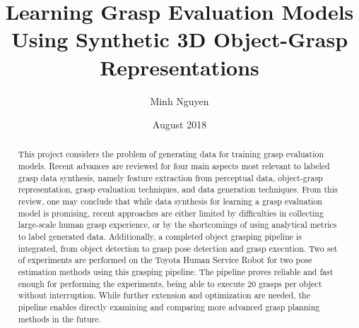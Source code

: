 \documentclass[rnd]{mas_report}
\author{Minh Nguyen}
\title{Learning Grasp Evaluation Models Using Synthetic 3D Object-Grasp Representations}
\date{August 2018}
\begin{document}
\begin{titlepage}
    \maketitle
\end{titlepage}


\pagestyle{plain}


\cleardoublepage
\statementpage

\begin{abstract}
This project considers the problem of generating data for training grasp evaluation models. Recent advances are reviewed
for four main aspects most relevant to labeled grasp data synthesis, namely feature extraction from perceptual data,
object-grasp representation, grasp evaluation techniques, and data generation techniques. From this review, one may
conclude that while data synthesis for learning a grasp evaluation model is promising, recent approaches are either
limited by difficulties in collecting large-scale human grasp experience, or by the shortcomings of using analytical
metrics to label generated data. Additionally, a completed object grasping pipeline is integrated, from object
detection to grasp pose detection and grasp execution. Two set of experiments are performed on the Toyota Human Service
Robot for two pose estimation methods using this grasping pipeline. The pipeline proves reliable and fast enough for
performing the experiments, being able to execute 20 grasps per object without interruption. While further extension and
optimization are needed, the pipeline enables directly examining and comparing more advanced grasp planning methods in
the future.
\end{abstract}

\tableofcontents
\listoffigures
\listoftables


\mainmatter %

\pagestyle{mainmatter}






\end{document}
